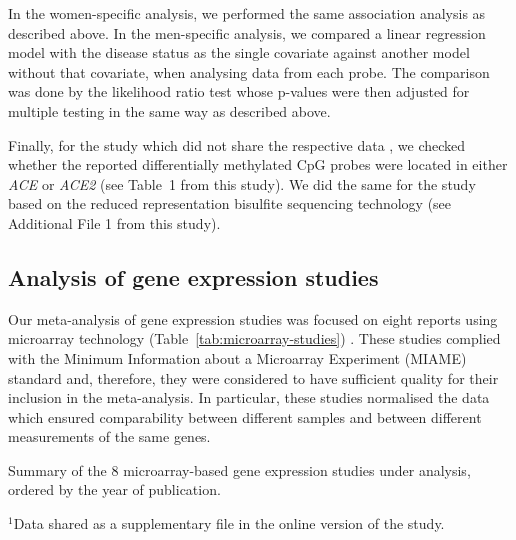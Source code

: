 In the women-specific analysis, we performed the same association analysis as described above. In the men-specific analysis, we compared a linear regression model with the disease status as the single covariate against another model without that covariate, when analysing data from each probe. The comparison was done by the likelihood ratio test whose p-values were then adjusted for multiple testing in the same way as described above.

Finally, for the study which did not share the respective data \citep{brenu2014MethylationProfile}, we checked whether the reported differentially methylated CpG probes were located in either \textit{ACE} or \textit{ACE2} (see Table~1 from this study). We did the same for the study based on the reduced representation bisulfite sequencing technology \citep{helliwell2020ChangesDNA} (see Additional File 1 from this study).

\subsection{Analysis of gene expression studies}

Our meta-analysis of gene expression studies was focused on eight reports using microarray technology (Table~\ref{tab:microarray-studies}) \citep{whistlerExerciseResponsiveGenes2005, kaushik2005GeneExpression, kerr2008GeneExpression, saikiIdentificationMarkerGenes2008, pietrangelo2009TranscriptionProfile, gowGeneSignaturePostinfectious2009, smithConvergentGenomicStudies2011, jeffreyTreatmentAvenuesMyalgic2019}. These studies complied with the Minimum Information about a Microarray Experiment (MIAME) standard \citep{brazma2001MinimumInformation} and, therefore, they were considered to have sufficient quality for their inclusion in the meta-analysis. In particular, these studies normalised the data which ensured comparability between different samples and between different measurements of the same genes.

\begin{table}[h]
    \centering
    \caption[Summary of the 8 microarray-based gene expression studies under analysis]{Summary of the 8 microarray-based gene expression studies under analysis, ordered by the year of publication.}
    \resizebox{\textwidth}{!}{}
    \label{tab:microarray-studies}
    \raggedright{\scriptsize $^1$Data shared as a supplementary file in the online version of the study.}
\end{table}

